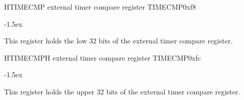 \documentclass[12pt]{article}
\begin{document}
\begin{register}{H}{TIMECMP external timer compare register TIMECMP}{0xf8}
\label{timecmp}
\regnewline%
\end{register}
\begin{regdesc}[0.8\textwidth]\begin{reglist}[00000000]
\itemsep-1.5ex
\item [TIMECMP] This register holds the low 32 bits of the external timer compare register.
\end{reglist}\end{regdesc}

\begin{register}{H}{TIMECMPH external timer compare register TIMECMP}{0xfc}
\label{timecmph}
\regnewline%
\end{register}
\begin{regdesc}[0.8\textwidth]\begin{reglist}[000000000]
\itemsep-1.5ex
\item [TIMECMPH] This register holds the upper 32 bits of the external timer compare register.
\end{reglist}\end{regdesc}
\end{document}
